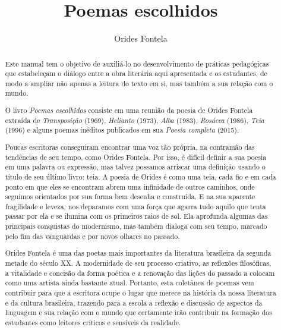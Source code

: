 \documentclass[12pt]{extarticle}
\begin{document}
\newcommand{\AutorLivro}{Orides Fontela}
\newcommand{\TituloLivro}{Poemas escolhidos}
\newcommand{\Tema}{Ficção, mistério e fantasia}
\newcommand{\Genero}{Poema}
\newcommand{\imagemCapa}{./images/PNLD0030-01.png}
\newcommand{\issnppub}{978-65-994484-0-9}
\newcommand{\issnepub}{978-65-994484-2-3}
\newcommand{\colaborador}{{Rodrigo Ribeiro Neves}}


\title{\TituloLivro}
\author{\AutorLivro}
\def\authornotes{\colaborador}

\date{}
\maketitle

\begin{abstract}
Este manual tem o objetivo de auxiliá-lo no desenvolvimento de práticas
pedagógicas que estabeleçam o diálogo entre a obra literária aqui
apresentada e os estudantes, de modo a ampliar não apenas a leitura do
texto em si, mas também a sua relação com o mundo.

O livro \emph{Poemas escolhidos} consiste em uma reunião da poesia de
Orides Fontela extraída de \emph{Transposição} (1969), \emph{Helianto}
(1973), \emph{Alba} (1983), \emph{Rosácea} (1986), \emph{Teia} (1996) e
alguns poemas inéditos publicados em sua \emph{Poesia completa} (2015).

Poucas escritoras conseguiram encontrar uma voz tão própria, na
contramão das tendências de seu tempo, como Orides Fontela. Por isso, é
difícil definir a sua poesia em uma palavra ou expressão, mas talvez
possamos arriscar uma definição usando o título de seu último livro:
teia. A poesia de Orides é como uma teia, cada fio e em cada ponto em
que eles se encontram abrem uma infinidade de outros caminhos, onde
seguimos orientados por sua forma bem desenha e construída. E na sua
aparente fragilidade e leveza, nos deparamos com uma força que agarra
tudo aquilo que tenta passar por ela e se ilumina com os primeiros raios
de sol. Ela aprofunda algumas das principais conquistas do modernismo,
mas também dialoga com seu tempo, marcado pelo fim das vanguardas e por
novos olhares no passado.

Orides Fontela é uma das poetas mais importantes da literatura
brasileira da segunda metade do século XX. A modernidade de seu processo
criativo, as reflexões filosóficas, a vitalidade e concisão da forma
poética e a renovação das lições do passado a colocam como uma artista
ainda bastante atual. Portanto, esta coletânea de poemas vem contribuir
para que a escritora ocupe o lugar que merece na história da nossa
literatura e da cultura brasileira, trazendo para a escola a reflexão e
discussão de aspectos da linguagem e sua relação com o mundo que
certamente irão contribuir na formação dos estudantes como leitores
críticos e sensíveis da realidade.



\end{abstract}
\end{document}
